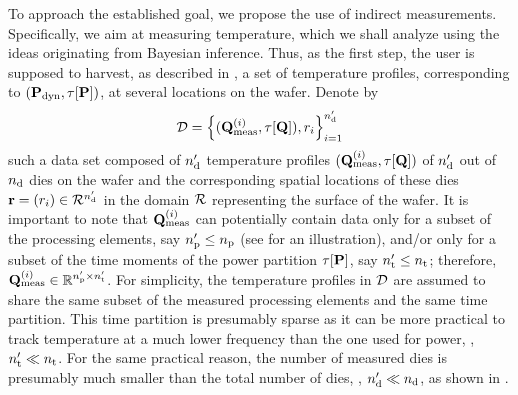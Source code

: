 To approach the established goal, we propose the use of indirect measurements. Specifically, we aim at measuring temperature, which we shall analyze using the ideas originating from Bayesian inference. Thus, as the first step, the user is supposed to harvest, as described in , a set of temperature profiles, corresponding to $(\mathbf{P}_{\text{dyn}}, \tau[\mathbf{P}])$, at several locations on the wafer. Denote by
\[
  \mathcal{D} = \left\{ (\mathbf{Q}^{(i)}_{\text{meas}}, \tau[\mathbf{Q}]), r_i \right\}_{i = 1}^{n_\text{d}'}
\]
such a data set composed of ${n_\text{d}'}$ temperature profiles $(\mathbf{Q}^{(i)}_{\text{meas}}, \tau[\mathbf{Q}])$ of ${n_\text{d}'}$ out of ${n_\text{d}}$ dies on the wafer and the corresponding spatial locations of these dies $\mathbf{r} = (r_i) \in \mathcal{R}^{n_\text{d}'}$ in the domain $\mathcal{R}$ representing the surface of the wafer.
It is important to note that $\mathbf{Q}^{(i)}_{\text{meas}}$ can potentially contain data only for a subset of the processing elements, say ${n_\text{p}'} \leq {n_\text{p}}$ (see  for an illustration), and/or only for a subset of the time moments of the power partition $\tau[\mathbf{P}]$, say ${n_\text{t}'} \leq {n_\text{t}}$; therefore, $\mathbf{Q}^{(i)}_{\text{meas}} \in \mathbb{R}^{{n_\text{p}'} \times {n_\text{t}'}}$.
For simplicity, the temperature profiles in $\mathcal{D}$ are assumed to share the same subset of the measured processing elements and the same time partition.
This time partition is presumably sparse as it can be more practical to track temperature at a much lower frequency than the one used for power, \ie, ${n_\text{t}'} \ll {n_\text{t}}$.
For the same practical reason, the number of measured dies is presumably much smaller than the total number of dies, \ie, ${n_\text{d}'} \ll {n_\text{d}}$, as shown in .
